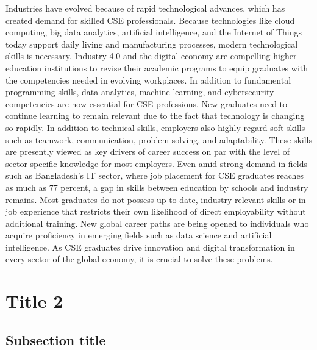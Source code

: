 \documentclass[final,5p,times,twocolumn,authoryear]{elsarticle}
\begin{document}
Industries have evolved because of rapid technological advances, which has created demand for skilled CSE professionals. Because technologies like cloud computing, big data analytics, artificial intelligence, and the Internet of Things today support daily living and manufacturing processes, modern technological skills is necessary.  Industry 4.0 and the digital economy are compelling higher education institutions to revise their academic programs to equip graduates with the competencies needed in evolving workplaces. In addition to fundamental programming skills, data analytics, machine learning, and cybersecurity competencies are now essential for CSE professions. New graduates need to continue learning to remain relevant due to the fact that technology is changing so rapidly. In addition to technical skills, employers also highly regard soft skills such as teamwork, communication, problem-solving, and adaptability.
These skills are presently viewed as key drivers of career success on par with the level of sector-specific knowledge for most employers. Even amid strong demand in fields such as Bangladesh's IT sector, where job placement for CSE graduates reaches as much as 77 percent, a gap in skills between education by schools and industry remains. Most graduates do not possess up-to-date, industry-relevant skills or in-job experience that restricts their own likelihood of direct employability without additional training. New global career paths are being opened to individuals who acquire proficiency in emerging fields such as data science and artificial intelligence. As CSE graduates drive innovation and digital transformation in every sector of the global economy, it is crucial to solve these problems.





\section{Title 2}
\lipsum[1]

\subsection{Subsection title}
\end{document}
